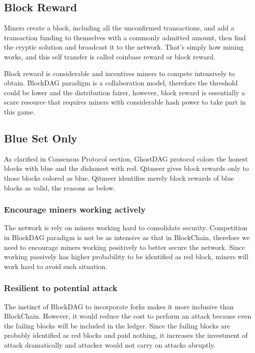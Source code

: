 \documentclass[a4paper,11pt]{article}
\begin{document}
\subsection{Block Reward}
Miners create a block, including all the unconfirmed transactions, and add a transaction funding to themselves with a commonly admitted amount, then find the cryptic solution and broadcast it to the network. That's simply how mining works, and  this self transfer is called coinbase reward or block reward. 

Block reward is considerable and incentives miners to compete intensively to obtain.  BlockDAG paradigm is a collaboration model, therefore the threshold could be lower and the distribution  fairer, however, block reward is essentially a scare resource that requires miners with considerable hash power to take part in this game.

\subsection*{Blue Set Only}
As clarified in Consensus Protocol section, GhostDAG protocol colors the honest blocks with blue and the dishonest with red. Qitmeer gives block rewards only to those blocks colored as blue.
Qitmeer identifies merely block rewards of blue blocks as valid, the reasons as below.

\subsubsection*{Encourage miners working actively}
The network is rely on miners working hard to consolidate security. Competition in BlockDAG paradigm is not be as intensive as that in BlockChain, therefore we need to encourage miners working positively to better secure the network. Since working passively has higher probability to be identified as red block, miners will work hard to avoid such situation.

\subsubsection*{Resilient to potential attack}
The instinct of BlockDAG to incorporate forks makes it more inclusive than BlockChain. However, it would reduce the cost to perform an attack because even the failing blocks will be included in the ledger. Since the failing blocks are probably identified as red blocks and paid nothing, it increases the investment of attack dramatically and attacker would not carry on attacks abruptly.
\end{document}
